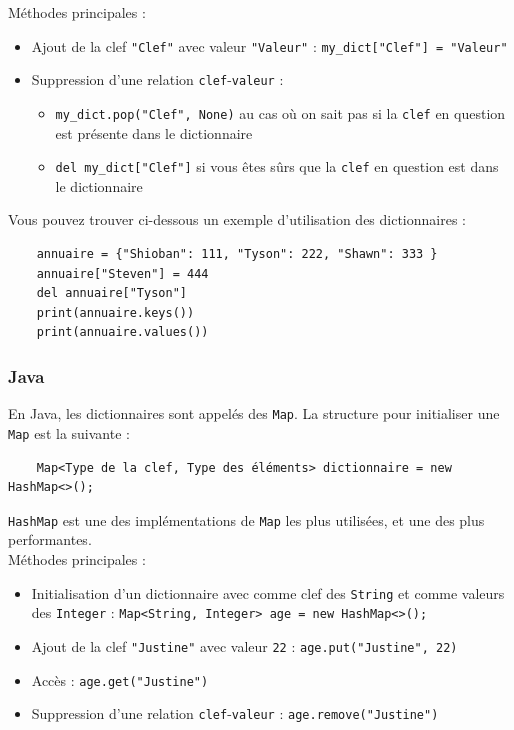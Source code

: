 Méthodes principales :
\begin{itemize}
    \item Ajout de la clef \lstinline{"Clef"} avec valeur \lstinline{"Valeur"} : \lstinline{my_dict["Clef"] = "Valeur"}
    \item Suppression d'une relation \lstinline{clef}-\lstinline{valeur} : 
    \begin{itemize}
        \item \lstinline{my_dict.pop("Clef", None)} au cas où on sait pas si la \lstinline{clef} en question est présente dans le dictionnaire
        \item \lstinline{del my_dict["Clef"]} si vous êtes sûrs que la \lstinline{clef} en question est dans le dictionnaire
    \end{itemize}

\end{itemize}

Vous pouvez trouver ci-dessous un exemple d'utilisation des dictionnaires :

\begin{verbatim}
    annuaire = {"Shioban": 111, "Tyson": 222, "Shawn": 333 }
    annuaire["Steven"] = 444
    del annuaire["Tyson"]
    print(annuaire.keys())
    print(annuaire.values())
\end{verbatim}

\subsubsection{Java}

En Java, les dictionnaires sont appelés des \lstinline{Map}. La structure pour initialiser une \lstinline{Map} est la suivante :

\begin{verbatim}
	Map<Type de la clef, Type des éléments> dictionnaire = new HashMap<>();
\end{verbatim}

\lstinline{HashMap} est une des implémentations de \lstinline{Map} les plus utilisées, et une des plus performantes. \\

Méthodes principales :
\begin{itemize}
    \item Initialisation d'un dictionnaire avec comme clef des \lstinline{String} et comme valeurs des \lstinline{Integer} : \lstinline{Map<String, Integer> age = new HashMap<>();}
    \item Ajout de la clef \lstinline{"Justine"} avec valeur \lstinline{22} : \lstinline{age.put("Justine", 22)}
    \item Accès : \lstinline{age.get("Justine")}
    \item Suppression d'une relation \lstinline{clef}-\lstinline{valeur} : \lstinline{age.remove("Justine")}
\end{itemize}


